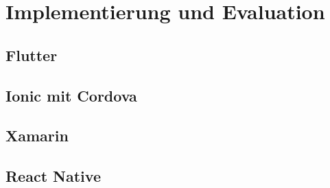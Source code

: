 \chapter{Implementierung und Evaluation}
\label{ch:Evaluation}

\section{Flutter}
\section{Ionic mit Cordova}
\section{Xamarin}
\section{React Native}